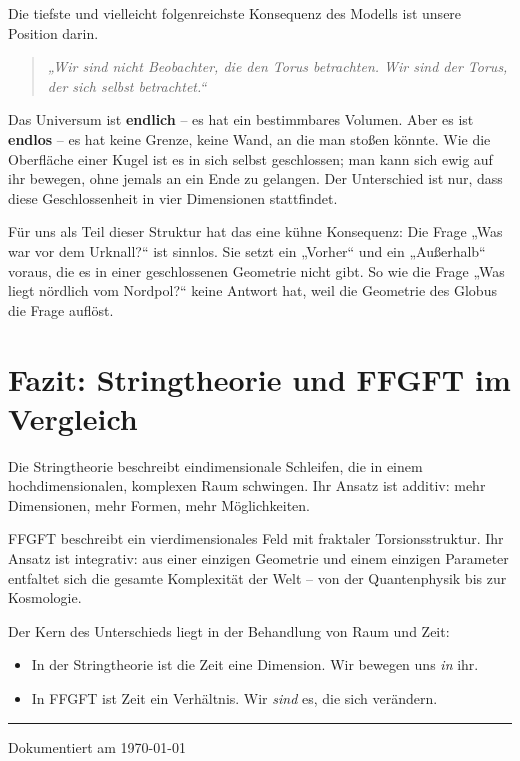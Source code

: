 	Die tiefste und vielleicht folgenreichste Konsequenz des Modells ist unsere Position darin.
	
	\begin{quote}
		\textit{„Wir sind nicht Beobachter, die den Torus betrachten. Wir sind der Torus, der sich selbst betrachtet.“}
	\end{quote}
	
	Das Universum ist \textbf{endlich} – es hat ein bestimmbares Volumen. Aber es ist \textbf{endlos} – es hat keine Grenze, keine Wand, an die man stoßen könnte. Wie die Oberfläche einer Kugel ist es in sich selbst geschlossen; man kann sich ewig auf ihr bewegen, ohne jemals an ein Ende zu gelangen. Der Unterschied ist nur, dass diese Geschlossenheit in vier Dimensionen stattfindet.
	
	Für uns als Teil dieser Struktur hat das eine kühne Konsequenz: Die Frage „Was war vor dem Urknall?“ ist sinnlos. Sie setzt ein „Vorher“ und ein „Außerhalb“ voraus, die es in einer geschlossenen Geometrie nicht gibt. So wie die Frage „Was liegt nördlich vom Nordpol?“ keine Antwort hat, weil die Geometrie des Globus die Frage auflöst.
	
	\section*{Fazit: Stringtheorie und FFGFT im Vergleich}
	
	Die Stringtheorie beschreibt eindimensionale Schleifen, die in einem hochdimensionalen, komplexen Raum schwingen. Ihr Ansatz ist additiv: mehr Dimensionen, mehr Formen, mehr Möglichkeiten.
	
	FFGFT beschreibt ein vierdimensionales Feld mit fraktaler Torsionsstruktur. Ihr Ansatz ist integrativ: aus einer einzigen Geometrie und einem einzigen Parameter entfaltet sich die gesamte Komplexität der Welt – von der Quantenphysik bis zur Kosmologie.
	
	Der Kern des Unterschieds liegt in der Behandlung von Raum und Zeit:
	\begin{itemize}
		\item In der Stringtheorie ist die Zeit eine Dimension. Wir bewegen uns \textit{in} ihr.
		\item In FFGFT ist Zeit ein Verhältnis. Wir \textit{sind} es, die sich verändern.
	\end{itemize}
	
	\vspace{1cm}
	\begin{center}
		\rule{5cm}{0.4pt}
		
		\small{Dokumentiert am \today}
	\end{center}
